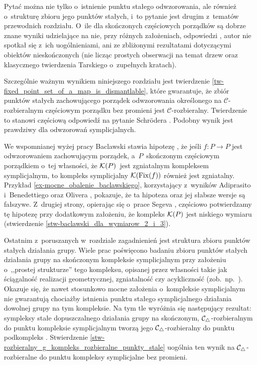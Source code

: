 Pytać można nie tylko o~istnienie punktu stałego odwzorowania, ale również o~strukturę zbioru jego punktów stałych, i~to pytanie jest drugim z~tematów przewodnich rozdziału. O~ile dla skończonych częściowych porządków są dobrze znane wyniki udzielające na nie, przy różnych założeniach, odpowiedzi \cite{Baclawski79,Duffus80a,Schroder99}, autor nie spotkał się z~ich uogólnieniami, ani ze zbliżonymi rezultatami dotyczącymi obiektów nieskończonych (nie licząc prostych obserwacji na temat drzew oraz klasycznego twierdzenia Tarskiego \cite{Tarski55} o~zupełnych kratach).

Szczególnie ważnym wynikiem niniejszego rozdziału jest twierdzenie \ref{tw-fixed_point_set_of_a_map_is_dismantlable}, które gwarantuje, że zbiór punktów stałych zachowującego porządek odwzorowania określonego na $\mathcal{C}$-rozbieralnym częściowym porządku bez promieni jest \mbox{$\mathcal{C}$-rozbieralny}. Twierdzenie to stanowi częściową odpowiedź na pytanie Schr{\"o}dera \cite[s. 136]{Schroder03}. Podobny wynik jest prawdziwy dla odwzorowań symplicjalnych. 

We wspomnianej wyżej pracy Baclawski stawia hipotezę \cite[Conjecture 34]{Baclawski12}, że jeśli $f\colon P\to P$ jest odwzorowaniem zachowującym porządek, a~$P$~skończonym częściowym porządkiem o~tej własności, że $\mathcal{K}(P)$~jest zgniatalnym kompleksem symplicjalnym, to kompleks symplicjalny $\mathcal{K}(\operatorname{Fix}(f))$ również jest zgniatalny. Przykład \ref{ex-mocne_obalenie_baclawskiego}, korzystający z~wyników Adiprasito i~Benedettiego \cite{Adiprasito13a} oraz Olivera \cite{Oliver75}, pokazuje, że ta hipoteza oraz jej słabsze wersje są fałszywe. Z~drugiej strony, opierając się o~prace Segeva \cite{Segev93,Segev94}, częściowo potwierdzamy tę hipotezę przy dodatkowym założeniu, że kompleks $\mathcal{K}(P)$ jest niskiego wymiaru (stwierdzenie \ref{stw-baclawski_dla_wymiarow_2_i_3}).

Ostatnim z~poruszanych w~rozdziale zagadnienień jest struktura zbioru punktów stałych działania grupy. Wiele prac poświęcono  badaniu zbioru punktów stałych działania grupy na skończonym kompleksie symplicjalnym przy założeniu o~,,prostej strukturze'' tego kompleksu, opisanej przez własności takie jak ściągalność realizacji geometrycznej, zgniatalność czy acykliczność (zob.~np.~\cite{Smith42, Oliver75,Segev93,Segev94}). Okazuje się, że nawet stosunkowo mocne założenia o~kompleksie symplicjalnym nie gwarantują chociażby istnienia punktu stałego symplicjalnego działania dowolnej grupy na tym kompleksie. Na tym tle wyróżnia się następujący rezultat: sympleksy stałe dopuszczalnego działania grupy na skończonym, \mbox{$\mathcal{C}_\triangle$-rozbieralnym} do punktu kompleksie symplicjalnym tworzą jego \mbox{$\mathcal{C}_\triangle$-rozbieralny} do punktu podkompleks \cite{Barmak12,Hensel14}. Stwierdzenie \ref{stw-rozbieralny_g_kompleks_rozbieralne_punkty_stale} uogólnia ten wynik na \mbox{$\mathcal{C}_\triangle$}-rozbieralne do punktu kompleksy symplicjalne bez promieni.

